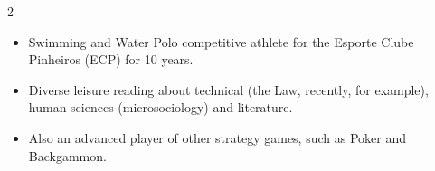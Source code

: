 \documentclass[10pt]{article} %
\begin{document}
\begin{paracol}{2}
\begin{itemize}

    \itemsep0em
    \item Swimming and Water Polo competitive athlete for the Esporte Clube Pinheiros (ECP) for 10 years.
    \item Diverse leisure reading about technical (the Law, recently, for example), human sciences (microsociology) and literature.
    \item Also an advanced player of other strategy games, such as Poker and Backgammon.
    
\end{itemize}

\end{paracol}

\end{document}
